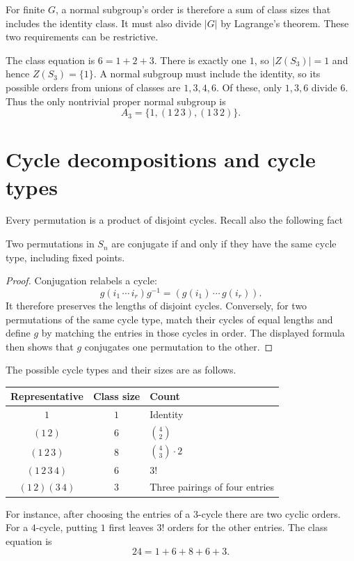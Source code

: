 \documentclass[reqno,11pt]{amsart}
\begin{document}
For finite $G$, a normal subgroup's order is therefore a sum of
class sizes that includes the identity class. It must also divide
$|G|$ by Lagrange's theorem. These two requirements can be restrictive.

\begin{example}
The class equation is $6=1+2+3$. There is exactly one $1$, so
$|Z(S_3)|=1$ and hence $Z(S_3)=\{1\}$.
A normal subgroup must include
the identity, so its possible orders from unions of classes are
$1,3,4,6$. Of these, only $1,3,6$ divide $6$.
Thus the only nontrivial proper normal subgroup is
\[
  A_3=\{1,(1\,2\,3),(1\,3\,2)\}.
\]
\end{example}

\section{Cycle decompositions and cycle types}

Every permutation is a product of disjoint cycles.  Recall also the following fact

\begin{theorem}[Conjugacy in $S_n$]\label{thm:cycle-type}
Two permutations in $S_n$ are conjugate if and only if they have
the same cycle type, including fixed points.
\end{theorem}
\begin{proof}
Conjugation relabels a cycle:
\[
  g(i_1\,\cdots\,i_r)g^{-1}=(g(i_1)\,\cdots\,g(i_r)).
\]
It therefore preserves the lengths of disjoint cycles.
Conversely, for two permutations of the same cycle type, match
their cycles of equal lengths and define $g$ by matching the
entries in those cycles in order. The displayed formula then
shows that $g$ conjugates one permutation to the other.
\end{proof}

\begin{example}
The possible cycle types and their sizes are as follows.
\begin{center}
\begin{tabular}{ccl}
  \textbf{Representative} & \textbf{Class size} & \textbf{Count}\\ \hline
  $1$ & $1$ & Identity\\[2pt]
  $(1\,2)$ & $6$ & $\binom42$\\[2pt]
  $(1\,2\,3)$ & $8$ & $\binom43\cdot2$\\[2pt]
  $(1\,2\,3\,4)$ & $6$ & $3!$\\[2pt]
  $(1\,2)(3\,4)$ & $3$ & Three pairings of four entries
\end{tabular}
\end{center}
For instance, after choosing the entries of a $3$-cycle there are
two cyclic orders. For a $4$-cycle, putting $1$ first leaves $3!$
orders for the other entries. The class equation is
\[
  24=1+6+8+6+3.
\]
\end{example}
\end{document}
